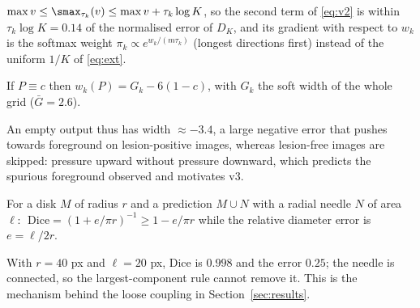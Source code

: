 \begin{proposition}\label{prop:smax}
$\max v\le\smax_{\tau_k}(v)\le\max v+\tau_k\log K$, so the second term of \eqref{eq:v2} is within $\tau_k\log K=0.14$ of the normalised error of $D_K$, and its gradient with respect to $w_k$ is the softmax weight $\pi_k\propto e^{w_k/(m\tau_k)}$ (longest directions first) instead of the uniform $1/K$ of \eqref{eq:ext}.
\end{proposition}

\begin{proposition}\label{prop:uniform}
If $P\equiv c$ then $w_k(P)=G_k-6(1-c)$, with $G_k$ the soft width of the whole grid ($\bar G=2.6$).
\end{proposition}
An empty output thus has width $\approx-3.4$, a large negative error that pushes towards foreground on lesion-positive images, whereas lesion-free images are skipped: pressure upward without pressure downward, which predicts the spurious foreground observed and motivates v3.

\begin{proposition}\label{prop:dice}
For a disk $M$ of radius $r$ and a prediction $M\cup N$ with a radial needle $N$ of area $\ell$: $\;\mathrm{Dice}=(1+e/\pi r)^{-1}\ge1-e/\pi r$ while the relative diameter error is $e=\ell/2r$.
\end{proposition}
With $r=40$ px and $\ell=20$ px, Dice is $0.998$ and the error $0.25$; the needle is connected, so the largest-component rule cannot remove it. This is the mechanism behind the loose coupling in Section~\ref{sec:results}.

